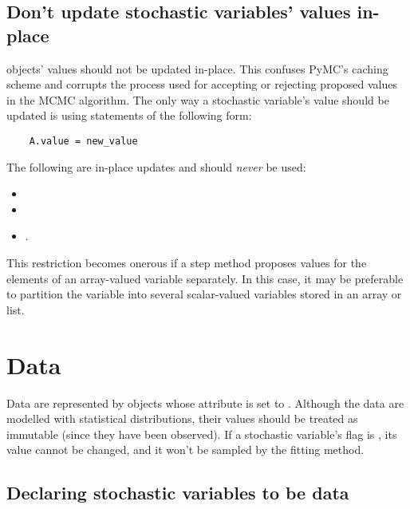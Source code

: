 \begin{center}
\begin{boxedminipage}{.9\textwidth}
\subsection{Don't update stochastic variables' values in-place}


 objects' values should not be updated in-place. This confuses PyMC's caching scheme and corrupts the process used for accepting or rejecting proposed values in the MCMC algorithm. The only way a stochastic variable's value should be updated is using statements of the following form:
\begin{verbatim}
    A.value = new_value
\end{verbatim}
The following are in-place updates and should \emph{never} be used:
\begin{itemize}
    \item {}
    \item {}
    \item {}.
\end{itemize}

This restriction becomes onerous if a step method proposes values for the elements of an array-valued variable separately. In this case, it may be preferable to partition the variable into several scalar-valued variables stored in an array or list.
\end{boxedminipage}
\end{center}


\section{Data} \label{data}


Data are represented by  objects whose  attribute is set to . Although the data are modelled with statistical distributions, their values should be treated as immutable (since they have been observed). If a stochastic variable's  flag is , its value cannot be changed, and it won't be sampled by the fitting method.

\subsection{Declaring stochastic variables to be data}

